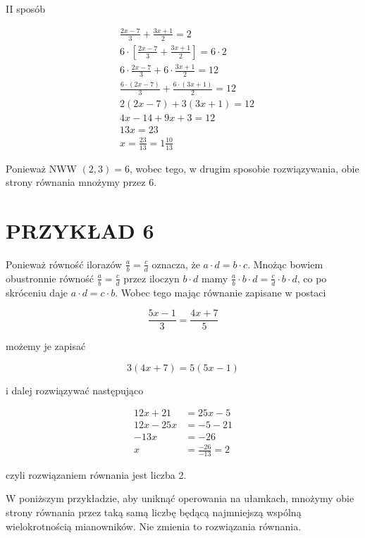 \documentclass[10pt]{article}
\begin{document}
II sposób

\[
\begin{aligned}
& \frac{2 x-7}{3}+\frac{3 x+1}{2}=2 \\
& 6 \cdot\left[\frac{2 x-7}{3}+\frac{3 x+1}{2}\right]=6 \cdot 2 \\
& 6 \cdot \frac{2 x-7}{3}+6 \cdot \frac{3 x+1}{2}=12 \\
& \frac{6 \cdot(2 x-7)}{3}+\frac{6 \cdot(3 x+1)}{2}=12 \\
& 2(2 x-7)+3(3 x+1)=12 \\
& 4 x-14+9 x+3=12 \\
& 13 x=23 \\
& x=\frac{23}{13}=1 \frac{10}{13}
\end{aligned}
\]

Ponieważ NWW \((2,3)=6\), wobec tego, w drugim sposobie rozwiązywania, obie strony równania mnożymy przez 6.

\section*{PRZYKŁAD 6}
Ponieważ równość ilorazów \(\frac{a}{b}=\frac{c}{d}\) oznacza, że \(a \cdot d=b \cdot c\). Mnożąc bowiem obustronnie równość \(\frac{a}{b}=\frac{c}{d}\) przez iloczyn \(b \cdot d\) mamy \(\frac{a}{b} \cdot b \cdot d=\frac{c}{d} \cdot b \cdot d\), co po skróceniu daje \(a \cdot d=c \cdot b\). Wobec tego mając równanie zapisane w postaci

\[
\frac{5 x-1}{3}=\frac{4 x+7}{5}
\]

możemy je zapisać

\[
3(4 x+7)=5(5 x-1)
\]

i dalej rozwiązywać następująco

\[
\begin{aligned}
12 x+21 & =25 x-5 \\
12 x-25 x & =-5-21 \\
-13 x & =-26 \\
x & =\frac{-26}{-13}=2
\end{aligned}
\]

czyli rozwiązaniem równania jest liczba 2.

W poniższym przykładzie, aby uniknąć operowania na ułamkach, mnożymy obie strony równania przez taką samą liczbę będącą najmniejszą wspólną wielokrotnością mianowników. Nie zmienia to rozwiązania równania.
\end{document}
